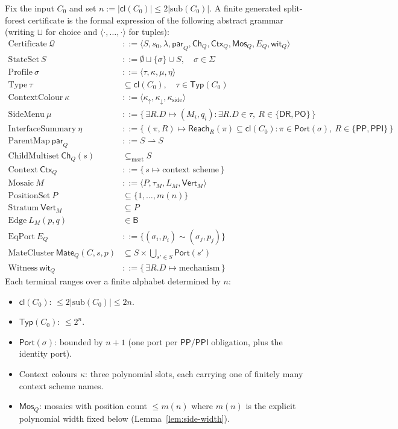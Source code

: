 \documentclass[11pt]{article}
\newcommand{\Base}{\mathsf{B}}
\newcommand{\DR}{\mathsf{DR}}
\newcommand{\PO}{\mathsf{PO}}
\newcommand{\PP}{\mathsf{PP}}
\newcommand{\PPI}{\mathsf{PPI}}
\newcommand{\Cl}{\mathsf{cl}}
\newcommand{\Typ}{\mathsf{Typ}}
\newcommand{\Q}{\mathcal Q}
\newcommand{\Mos}{\mathsf{Mos}}
\newcommand{\Ctx}{\mathsf{Ctx}}
\newcommand{\parr}{\mathsf{par}}
\newcommand{\Port}{\mathsf{Port}}
\newcommand{\Mate}{\mathsf{Mate}}
\newcommand{\Reach}{\mathrel{\mathsf{Reach}}}
\newcommand{\Vrt}{\mathsf{Vert}}
\begin{document}
Fix the input $C_0$ and set $n:=|\Cl(C_0)|\le 2|\mathrm{sub}(C_0)|$.
A finite generated split-forest certificate is the formal expression
of the following abstract grammar (writing $\sqcup$ for choice and
$\langle\cdot,\dots,\cdot\rangle$ for tuples):
\begin{align*}
  \text{Certificate}\ \Q
    &::= \langle S, s_0, \lambda, \parr_Q, \mathsf{Ch}_Q, \Ctx_Q,
            \Mos_Q, E_Q, \mathsf{wit}_Q \rangle \\
  \text{StateSet}\ S
    &::= \emptyset \sqcup \{\sigma\}\cup S,\quad \sigma\in\Sigma \\
  \text{Profile}\ \sigma
    &::= \langle \tau, \kappa, \mu, \eta \rangle \\
  \text{Type}\ \tau
    &\subseteq \Cl(C_0),\quad \tau\in\Typ(C_0) \\
  \text{ContextColour}\ \kappa
    &::= \langle \kappa_\uparrow,\kappa_\downarrow,
              \kappa_{\mathrm{side}}\rangle \\
  \text{SideMenu}\ \mu
    &::= \{\,\exists R.D\mapsto(M_i,q_i):
              \exists R.D\in\tau,\ R\in\{\DR,\PO\}\,\} \\
  \text{InterfaceSummary}\ \eta
    &::= \{\,(\pi,R)\mapsto \Reach_R(\pi)\subseteq\Cl(C_0):
              \pi\in\Port(\sigma),\ R\in\{\PP,\PPI\}\,\} \\
  \text{ParentMap}\ \parr_Q
    &::= S\rightharpoonup S \\
  \text{ChildMultiset}\ \mathsf{Ch}_Q(s)
    &\subseteq_{\mathrm{mset}} S \\
  \text{Context}\ \Ctx_Q
    &::= \{\,s\mapsto\text{context scheme}\,\} \\
  \text{Mosaic}\ M
    &::= \langle P,\tau_M, L_M, \Vrt_M\rangle \\
  \text{PositionSet}\ P
    &\subseteq \{1,\dots,m(n)\} \\
  \text{Stratum}\ \Vrt_M
    &\subseteq P \\
  \text{Edge}\ L_M(p,q)
    &\in \Base \\
  \text{EqPort}\ E_Q
    &::= \{(\sigma_i,p_i)\sim(\sigma_j,p_j)\} \\
  \text{MateCluster}\ \Mate_Q(C,s,p)
    &\subseteq S\times\bigcup_{s'\in S}\Port(s') \\
  \text{Witness}\ \mathsf{wit}_Q
    &::= \{\,\exists R.D\mapsto\text{mechanism}\,\}
\end{align*}
Each terminal ranges over a finite alphabet determined by $n$:
\begin{itemize}[leftmargin=2em]
  \item $\Cl(C_0)$: $\le 2|\mathrm{sub}(C_0)| \le 2n$.
  \item $\Typ(C_0)$: $\le 2^n$.
  \item $\Port(\sigma)$: bounded by $n+1$ (one port per $\PP/\PPI$
    obligation, plus the identity port).
  \item Context colours $\kappa$: three polynomial slots, each
    carrying one of finitely many context scheme names.
  \item $\Mos_Q$: mosaics with position count $\le m(n)$ where
    $m(n)$ is the explicit polynomial width fixed below
    (Lemma~\ref{lem:side-width}).
\end{itemize}
\end{document}
